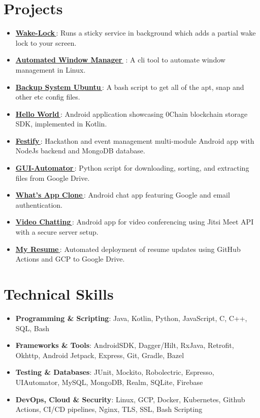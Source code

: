 \documentclass[letterpaper,1pt]{article}
\let\orighref\href
\renewcommand{\href}[2]{\orighref{#1}{#2\,\faExternalLink}}
\begin{document}
\section{Projects}
\begin{itemize}[leftmargin=*, itemsep=1pt, parsep=0pt]
  \item \href{https://github.com/yash10019coder/Wake-Lock}{\textbf{Wake-Lock}}: Runs a sticky service in background which adds a partial wake lock to your screen.
  \item \href{https://github.com/yash10019coder/AutomatedWindowManager}{\textbf{Automated Window Manager}} : A cli tool to automate window management in Linux.
  \item \href{https://github.com/yash10019coder/backup-system-ubuntu}{\textbf{Backup System Ubuntu}}: A bash script to get all of the apt, snap and other etc config files.
  \item \href{https://github.com/0chain/HelloWorld-Android}{\textbf{Hello World}}: Android application showcasing 0Chain blockchain storage SDK, implemented in Kotlin.
  \item \href{https://github.com/yash10019coder/festify-android}{\textbf{Festify}}: Hackathon and event management multi-module Android app with NodeJs backend and MongoDB database.
  \item \href{https://github.com/yash10019coder/Gui-Automator}{\textbf{GUI-Automator}}: Python script for downloading, sorting, and extracting files from Google Drive.
  \item \href{https://github.com/yash10019coder/Whats-App}{\textbf{What's App Clone}}: Android chat app featuring Google and email authentication.
  \item \href{https://github.com/yash10019coder/Video-Chatting}{\textbf{Video Chatting}}: Android app for video conferencing using Jitsi Meet API with a secure server setup.
  \item \href{https://github.com/yash10019coder/resume}{\textbf{My Resume}}: Automated deployment of resume updates using GitHub Actions and GCP to Google Drive.
\end{itemize}

%
\section{Technical Skills}
\begin{itemize}[leftmargin=*, itemsep=1pt, parsep=0pt]
  \selectfont\small
  \setlength\itemsep{0em}
  \setlength\parsep{0em}
  \item \textbf{Programming \& Scripting}: Java, Kotlin, Python, JavaScript, C, C++, SQL, Bash
  \item \textbf{Frameworks \& Tools}: AndroidSDK, Dagger/Hilt, RxJava, Retrofit, Okhttp, Android Jetpack, Express, Git, Gradle, Bazel
  \item \textbf{Testing \& Databases}: JUnit, Mockito, Robolectric, Espresso, UIAutomator, MySQL, MongoDB, Realm, SQLite, Firebase
  \item \textbf{DevOps, Cloud \& Security}: Linux, GCP, Docker, Kubernetes, Github Actions, CI/CD pipelines, Nginx, TLS, SSL, Bash Scripting
\end{itemize}


\end{document}
